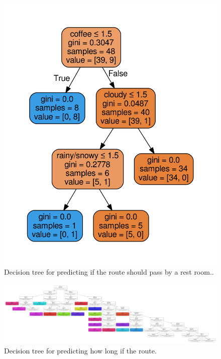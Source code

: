 \documentclass{sigchi}
\begin{document}
\begin{figure}[!h]
\centering
\includegraphics[width=1.0\columnwidth]{pics/decisionTree_6.png}
\caption{Decision tree for predicting if the route should pass by a rest room..}
\label{fig:dt6}
\end{figure}

\begin{figure}[!h]
\centering
\includegraphics[width=1.0\columnwidth]{pics/decisionTree_7.png}
\caption{Decision tree for predicting how long if the route.}
\label{fig:dt7}
\end{figure}
\end{document}
